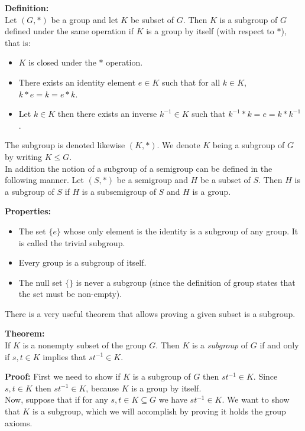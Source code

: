 \documentclass{article}
\begin{document}

\textbf{Definition:}\\ 
Let $(G,*)$ be a group and let $K$ be subset of $G$.  Then $K$ is a subgroup of $G$ defined under the same operation if $K$ is  a group by itself (with respect to $*$), that is:
\begin{itemize}
  \item $K$ is closed under the $*$ operation.
  \item There exists an identity element $e\in K$ such that for all $k \in K$, $k*e = k = e*k$.
  \item Let $k \in K$ then there exists an inverse $k^{-1} \in K$
  such that $k^{-1}*k = e = k*k^{-1}$.
\end{itemize}
The subgroup is denoted likewise $(K,*)$. We denote $K$ being a subgroup of $G$ by writing $K\leq G$.\\

In addition the notion of a subgroup of a semigroup can be defined in the following manner.  Let $(S,*)$ be a semigroup and $H$ be a subset of $S$. Then $H$ is a subgroup of $S$ if $H$ is a subsemigroup of $S$ and $H$ is a group.

\textbf{Properties:}
\begin{itemize}
  \item The set $\{e\}$ whose only element is the identity is a subgroup of any group.  It is called the trivial subgroup.
\item Every group is a subgroup of itself.
  \item The null set $\{ \}$ is never a subgroup (since the definition of group states that the set must be non-empty).
\end{itemize}

There is a very useful theorem that allows proving a given subset is a subgroup.

\textbf{Theorem:}\\
If $K$ is a nonempty subset of the group $G$.  Then $K$ is a \emph{subgroup} of $G$ if and only if $s,t \in K$ implies that $st^{-1} \in K$.

\textbf{Proof:}
First we need to show if $K$ is a subgroup of $G$ then $st^{-1} \in K$.  Since $s,t \in K$ then $st^{-1} \in K$, because $K$ is a group by itself.\\
Now, suppose that if for any $s,t\in K\subseteq G$ we have $st^{-1}\in K$. We want to show that $K$ is a subgroup, which we will accomplish by proving it holds the group axioms.
\end{document}
